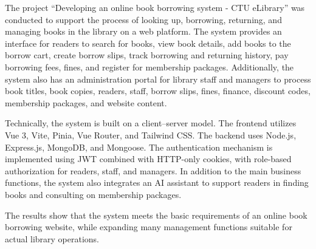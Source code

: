 \documentclass[../main.tex]{subfiles}
\begin{document}
The project ``Developing an online book borrowing system - CTU eLibrary'' was conducted to support the process of looking up, borrowing, returning, and managing books in the library on a web platform. The system provides an interface for readers to search for books, view book details, add books to the borrow cart, create borrow slips, track borrowing and returning history, pay borrowing fees, fines, and register for membership packages. Additionally, the system also has an administration portal for library staff and managers to process book titles, book copies, readers, staff, borrow slips, fines, finance, discount codes, membership packages, and website content.

Technically, the system is built on a client--server model. The frontend utilizes Vue 3, Vite, Pinia, Vue Router, and Tailwind CSS. The backend uses Node.js, Express.js, MongoDB, and Mongoose. The authentication mechanism is implemented using JWT combined with HTTP-only cookies, with role-based authorization for readers, staff, and managers. In addition to the main business functions, the system also integrates an AI assistant to support readers in finding books and consulting on membership packages.

The results show that the system meets the basic requirements of an online book borrowing website, while expanding many management functions suitable for actual library operations.
\end{document}
